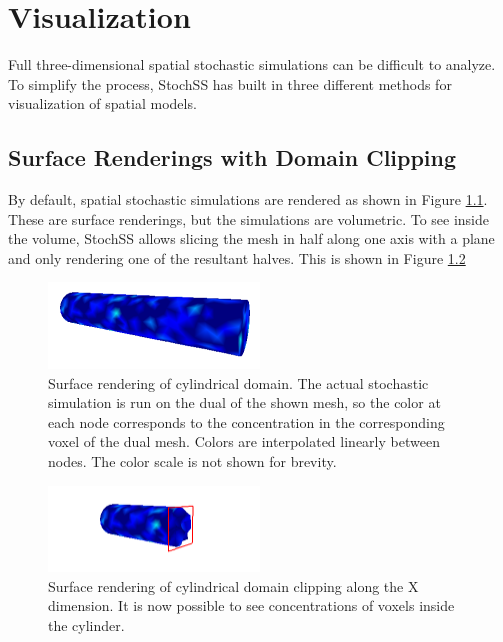 
\chapter{Visualization}
Full three-dimensional spatial stochastic simulations can be difficult to analyze. To simplify the process, StochSS has built in three different methods for visualization of spatial models.

\section{Surface Renderings with Domain Clipping}

By default, spatial stochastic simulations are rendered as shown in Figure \ref{surface}. These are surface renderings, but the simulations are volumetric. To see inside the volume, StochSS allows slicing the mesh in half along one axis with a plane and only rendering one of the resultant halves. This is shown in Figure \ref{clipx}

\begin{figure}[!ht]
  \centering
    \includegraphics[width=0.5\textwidth]{Vis/surface}
  \caption{ Surface rendering of cylindrical domain. The actual stochastic simulation is run on the dual of the shown mesh, so the color at each node corresponds to the concentration in the corresponding voxel of the dual mesh. Colors are interpolated linearly between nodes. The color scale is not shown for brevity. }
  \label{surface}
\end{figure}

\begin{figure}[!ht]
  \centering
    \includegraphics[width=0.5\textwidth]{Vis/clipx}
  \caption{ Surface rendering of cylindrical domain clipping along the X dimension. It is now possible to see concentrations of voxels inside the cylinder. }
  \label{clipx}
\end{figure}

